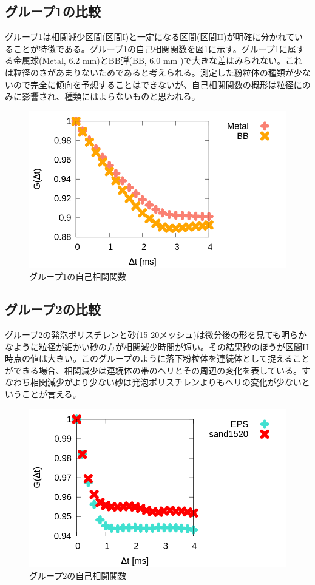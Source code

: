 \documentclass[a4paper,10pt,twocolumn,dvipdfmx]{jsarticle}
\newcommand{\II}{I\hspace{-.1em}I}
\begin{document}
\subsection{グループ1の比較}
グループ1は相関減少区間(区間I)と一定になる区間(区間\II )が明確に分かれていることが特徴である。グループ1の自己相関関数を図\ref{fig:one}に示す。グループ1に属する金属球(Metal, 6.2 mm)とBB弾(BB, 6.0 mm )で大きな差はみられない。これは粒径のさがあまりないためであると考えられる。測定した粉粒体の種類が少ないので完全に傾向を予想することはできないが、自己相関関数の概形は粒径にのみに影響され、種類にはよらないものと思われる。
\begin{figure}[H]
	\includegraphics[scale=0.4]{one.png}
	\caption{グループ1の自己相関関数}
	\label{fig:one}
\end{figure}
\subsection{グループ2の比較}
グループ2の発泡ポリスチレンと砂(15-20メッシュ)は微分後の形を見ても明らかなように粒径が細かい砂の方が相関減少時間が短い。その結果砂のほうが区間\II 時点の値は大きい。このグループのように落下粉粒体を連続体として捉えることができる場合、相関減少は連続体の帯のヘリとその周辺の変化を表している。すなわち相関減少がより少ない砂は発泡ポリスチレンよりもヘリの変化が少ないということが言える。
\begin{figure}[H]
	\includegraphics[scale=0.4]{two_big.png}
	\caption{グループ2の自己相関関数}
	\label{fig:two}
\end{figure}
\end{document}
